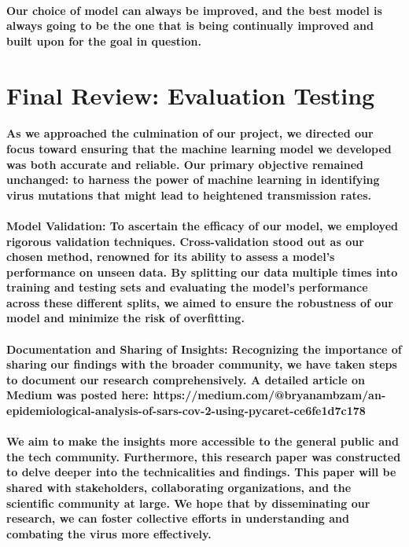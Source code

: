 \documentclass{article}
\begin{document}
\paragraph{Our choice of model can always be improved, and the best model is always going to be the one that is being continually improved and built upon for the goal in question. }
\section{Final Review: Evaluation  Testing}
\paragraph{As we approached the culmination of our project, we directed our focus toward ensuring that the machine learning model we developed was both accurate and reliable. Our primary objective remained unchanged: to harness the power of machine learning in identifying virus mutations that might lead to heightened transmission rates.}
\paragraph{\textbf{}}
\paragraph{\textbf{Model Validation}: To ascertain the efficacy of our model, we employed rigorous validation techniques. Cross-validation stood out as our chosen method, renowned for its ability to assess a model's performance on unseen data. By splitting our data multiple times into training and testing sets and evaluating the model's performance across these different splits, we aimed to ensure the robustness of our model and minimize the risk of overfitting.}
\paragraph{\textbf{Documentation and Sharing of Insights}: Recognizing the importance of sharing our findings with the broader community, we have taken steps to document our research comprehensively. A detailed article on Medium was posted here: https://medium.com/@bryanambzam/an-epidemiological-analysis-of-sars-cov-2-using-pycaret-ce6fe1d7c178}
\paragraph{We aim to make the insights more accessible to the general public and the tech community. Furthermore, this research paper was constructed to delve deeper into the technicalities and findings. This paper will be shared with stakeholders, collaborating organizations, and the scientific community at large. We hope that by disseminating our research, we can foster collective efforts in understanding and combating the virus more effectively.}
\end{document}
